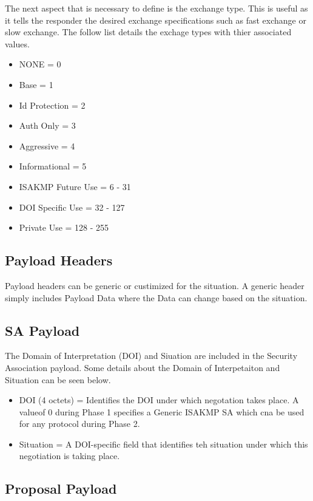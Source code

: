 \documentclass{article}
\begin{document}
The next aspect that is necessary to define is the exchange type. This is useful as it tells the responder the desired exchange specifications such as fast exchange or slow exchange. The follow list details the exchage types with thier associated values. 

\begin{itemize}
\item NONE = 0
\item Base = 1
\item Id Protection = 2
\item Auth Only = 3
\item Aggressive = 4
\item Informational = 5
\item ISAKMP Future Use = 6 - 31
\item DOI Specific Use = 32 - 127
\item Private Use = 128 - 255
\end{itemize}

\subsection {Payload Headers}

Payload headers can be generic or custimized for the situation. A generic header simply includes Payload Data where the Data can change based on the situation. 

\subsection {SA Payload}

The Domain of Interpretation (DOI) and Siuation are included in the Security Association payload. Some details about the Domain of Interpetaiton and Situation can be seen below.

\begin{itemize}
\item DOI (4 octets) = Identifies the DOI under which negotation takes place. A valueof 0 during Phase 1 specifies a Generic ISAKMP SA which cna be used for any protocol during Phase 2.
\item Situation = A DOI-specific field that identifies teh situation under which this negotiation is taking place. 
\end{itemize}

\subsection {Proposal Payload}
\end{document}
